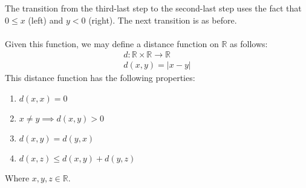 The transition from the third-last step to the second-last step uses the fact that $0\le x$ (left) and $y < 0$ (right). The next transition is as before.\\~\\
Given this function, we may define a distance function on $\mathbb{R}$ as follows:
\begin{align*}
    d : \mathbb{R}\times\mathbb{R} \to \mathbb{R}\\
    d(x, y) = |x-y|
\end{align*}
This distance function has the following properties:
\begin{enumerate}[nosep]
    \item $d(x, x) = 0$
    \item $x \neq y \implies d(x, y) > 0$
    \item $d(x, y) = d(y, x)$
    \item $d(x, z) \le d(x,y) + d(y, z)$
\end{enumerate}
Where $x, y, z \in\mathbb{R}.$